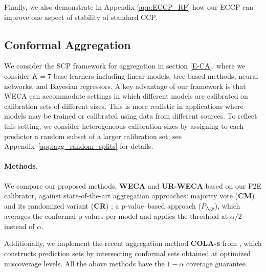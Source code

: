\documentclass{article}
\theoremstyle{plain}
\theoremstyle{definition}
\theoremstyle{remark}
\begin{document}
Finally, we also demonstrate in Appendix \ref{app:ECCP_RF} how our ECCP can improve one aspect of stability of standard CCP. 


\subsection{Conformal Aggregation}


We consider the SCP framework for aggregation in section \ref{E-CA}, where we consider $K=7$ base learners including linear models, tree-based methods, neural networks, and Bayesian regressors.   %
A key advantage of our framework is that WECA can accommodate settings in which different models are calibrated on calibration sets of different sizes. This is more realistic in applications where models may be trained or calibrated using data from different sources. To reflect this setting, we consider heterogeneous calibration sizes by assigning to each predictor a random subset of a larger calibration set; see Appendix~\ref{app:agg_random_splits} for details.


\paragraph{Methods.} We compare our proposed methods, \textbf{WECA} and \textbf{UR-WECA} based on our P2E calibrator, against  state-of-the-art aggregation approaches:  
majority vote (\textbf{CM}) and  its randomized variant (\textbf{CR}) \citep{gasparin2024merginguncertaintysetsmajority};  a p-value–based approach (\textbf{$P_{\text{Agg}}$}), which averages the conformal p-values per model and applies the threshold at $\alpha/2$ instead of $\alpha$. %

Additionally, we implement the recent aggregation method \textbf{COLA-s} from \citep{COLA}, which constructs prediction sets by intersecting conformal sets obtained at optimized miscoverage levels. All the above methods have the $1-\alpha$ coverage guarantee.
\end{document}
